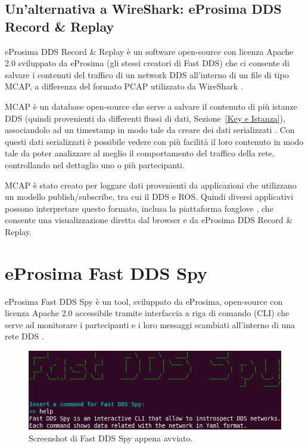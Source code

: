 \subsection{Un'alternativa a WireShark: eProsima DDS Record \& Replay}
eProsima DDS Record \& Replay è un software open-source con licenza 
Apache 2.0 sviluppato da eProsima (gli stessi creatori di Fast DDS) che 
ci consente di salvare i contenuti del traffico di un network DDS
all'interno di un file di tipo MCAP, a differenza del formato PCAP 
utilizzato da WireShark \cite{eProsimaDDSRecordeReplayDocumentation}.

MCAP è un database open-source che serve a salvare il contenuto 
di più istanze DDS (quindi provenienti da differenti flussi di dati, 
Sezione~\ref{Key e Istanza}), associandolo
ad un timestamp in modo tale da creare dei dati serializzati
\cite{mcap}.
Con questi dati serializzati è possibile vedere con più facilità 
il loro contenuto in modo tale da poter analizzare al meglio
il comportamento del traffico della rete, controllando nel dettaglio 
uno o più partecipanti.   

MCAP è stato creato per loggare dati provenienti da applicazioni 
che utilizzano un modello publish/subscribe, tra cui il DDS e ROS.
Quindi diversi applicativi possono interpretare questo formato, 
inclusa la piattaforma 
foxglove \cite{foxglove}, 
che consente una visualizzazione diretta dal browser e da
eProsima DDS Record \& Replay.


\section{eProsima Fast DDS Spy}
eProsima Fast DDS Spy è un tool, sviluppato da eProsima, 
open-source con licenza Apache 2.0 accessibile
tramite interfaccia a riga di comando (CLI) che serve ad monitorare i partecipanti
e i loro messaggi scambiati all'interno di una rete DDS \cite{FastDDSSpy}. 

\begin{figure}[H]
    \centering
    \includegraphics[width=15.2cm, keepaspectratio]{img/fastddsspyintro.png}
    \caption{Screenshot di Fast DDS Spy appena avviato.}
    \label{fastddsspyintro}
\end{figure}

